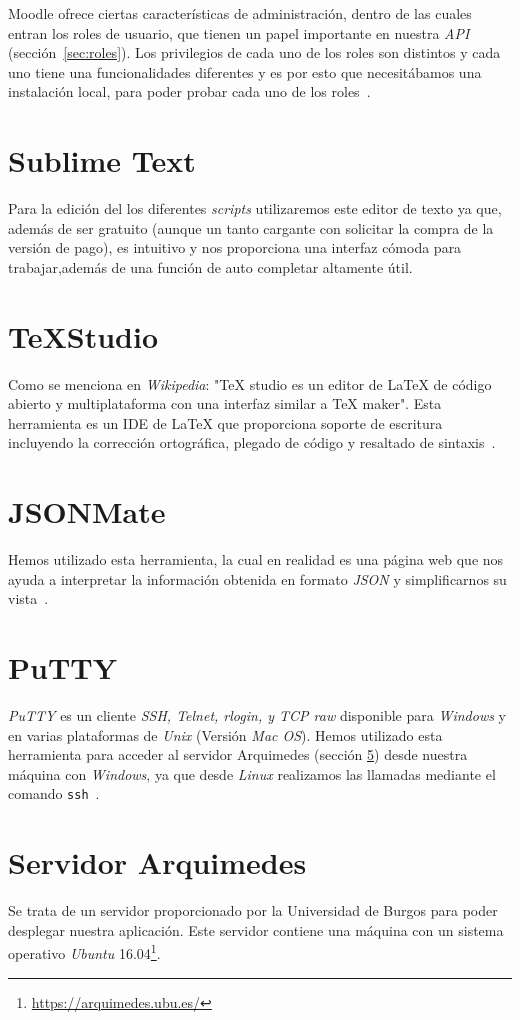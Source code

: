 Moodle ofrece ciertas características de administración, dentro de las cuales entran los roles de usuario, que tienen un papel importante en nuestra \textit{API} (sección~\ref{sec:roles}). Los privilegios de cada uno de los roles son distintos y cada uno tiene una funcionalidades diferentes y es por esto que necesitábamos una instalación local, para poder probar cada uno de los roles~\cite{wiki:moodle}.

\section{Sublime Text}
Para la edición del los diferentes \textit{scripts} utilizaremos este editor de texto ya que, además de ser gratuito (aunque un tanto cargante con solicitar la compra de la versión de pago), es intuitivo y nos proporciona una interfaz cómoda para trabajar,además de una función de auto completar altamente útil.

\section{\TeX Studio}
Como se menciona en \textit{Wikipedia}: "\TeX{} studio es un editor de \LaTeX{} de código abierto y multiplataforma con una interfaz similar a \TeX{} maker". Esta herramienta es un IDE de \LaTeX{} que proporciona soporte de escritura incluyendo la corrección ortográfica, plegado de código y resaltado de sintaxis~\cite{wiki:texstudio}.


\section{JSONMate}
Hemos utilizado esta herramienta, la cual en realidad es una página web que nos ayuda a interpretar la información obtenida en formato \textit{JSON} y simplificarnos su vista~\cite{json:jsnomate}.

\section{PuTTY}
\textit{PuTTY} es un cliente \textit{SSH, Telnet, rlogin, y TCP raw} disponible para \textit{Windows} y en varias plataformas de \textit{Unix} (Versión \textit{Mac OS}). Hemos utilizado esta herramienta para acceder al servidor Arquimedes (sección \ref{sec:arquimedes}) desde nuestra máquina con \textit{Windows}, ya que desde \textit{Linux} realizamos las llamadas mediante el comando \texttt{ssh}~\cite{wiki:putty}.

\section{Servidor Arquimedes}\label{sec:arquimedes}
Se trata de un servidor proporcionado por la Universidad de Burgos para poder desplegar nuestra aplicación. Este servidor contiene una máquina con un sistema operativo \textit{Ubuntu} 16.04\footnote{\url{https://arquimedes.ubu.es/}}.

